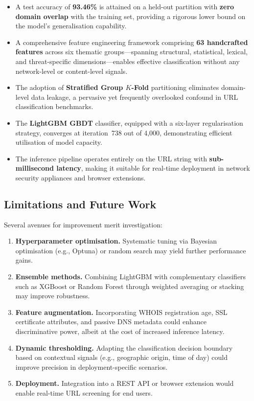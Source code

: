 \documentclass[a4paper,12pt]{article}
\begin{document}
\begin{itemize}
    \item A test accuracy of \textbf{93.46\%} is attained on a held-out partition with \textbf{zero domain overlap} with the training set, providing a rigorous lower bound on the model's generalisation capability.
    \item A comprehensive feature engineering framework comprising \textbf{63 handcrafted features} across six thematic groups---spanning structural, statistical, lexical, and threat-specific dimensions---enables effective classification without any network-level or content-level signals.
    \item The adoption of \textbf{Stratified Group $K$-Fold} partitioning eliminates domain-level data leakage, a pervasive yet frequently overlooked confound in URL classification benchmarks.
    \item The \textbf{LightGBM GBDT} classifier, equipped with a six-layer regularisation strategy, converges at iteration~738 out of 4,000, demonstrating efficient utilisation of model capacity.
    \item The inference pipeline operates entirely on the URL string with \textbf{sub-millisecond latency}, making it suitable for real-time deployment in network security appliances and browser extensions.
\end{itemize}

\subsection{Limitations and Future Work}

Several avenues for improvement merit investigation:

\begin{enumerate}
    \item \textbf{Hyperparameter optimisation.} Systematic tuning via Bayesian optimisation (e.g., Optuna) or random search may yield further performance gains.
    \item \textbf{Ensemble methods.} Combining LightGBM with complementary classifiers such as XGBoost or Random Forest through weighted averaging or stacking may improve robustness.
    \item \textbf{Feature augmentation.} Incorporating WHOIS registration age, SSL certificate attributes, and passive DNS metadata could enhance discriminative power, albeit at the cost of increased inference latency.
    \item \textbf{Dynamic thresholding.} Adapting the classification decision boundary based on contextual signals (e.g., geographic origin, time of day) could improve precision in deployment-specific scenarios.
    \item \textbf{Deployment.} Integration into a REST API or browser extension would enable real-time URL screening for end users.
\end{enumerate}
\end{document}
